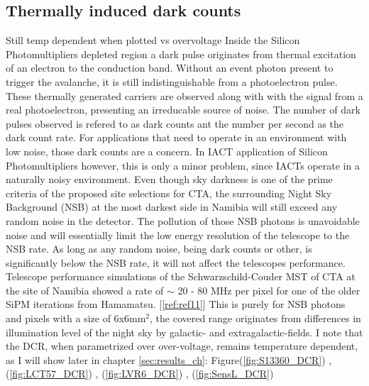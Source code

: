 \documentclass[12pt,article,type=msc,colorback,accentcolor=tud9c]{tudthesis}
\begin{document}
\subsection{Thermally induced dark counts}
Still temp dependent when plotted vs overvoltage
Inside the Silicon Photomultipliers depleted region a dark pulse originates from thermal excitation of an electron to the conduction band. Without an event photon present to trigger the avalanche, it is still indistinguishable from a photoelectron pulse. These thermally generated carriers are observed along with with the signal from a real photoelectron, presenting an irreducable source of noise. The number of dark pulses observed is refered to as dark counts ant the number per second as the dark count rate. For applications that need to operate in an environment with low noise, those dark counts are a concern. In IACT application of Silicon Photomultipliers however, this is only a minor problem, since IACTs operate in a naturally noisy environment. Even though sky darkness is one of the prime criteria of the proposed site selections for CTA, the surrounding Night Sky Background (NSB) at the most darkest side in Namibia will still exceed any random noise in the detector. The pollution of those NSB photons is unavoidable noise and will essentially limit the low energy resolution of the telescope to the NSB rate. As long as any random noise, being dark counts or other, is significantly below the NSB rate, it will not affect the telescopes performance.\\
Telescope performance simulations of the Schwarzschild-Couder MST of CTA at the site of Namibia showed a rate of $\sim$ 20 - 80 MHz per pixel for one of the older SiPM iterations from Hamamatsu. [\ref{ref:ref11}] This is purely for NSB photons and pixels with a size of 6x6mm$^2$, the covered range originates from differences in illumination level of the night sky by galactic- and extragalactic-fields. 
I note that the DCR, when parametrized over over-voltage, remains temperature dependent, as I will show later in chapter \ref{sec:results_ch}: Figure(\ref{fig:S13360_DCR}) , (\ref{fig:LCT57_DCR}) , (\ref{fig:LVR6_DCR}) , (\ref{fig:SensL_DCR})\\
\end{document}
